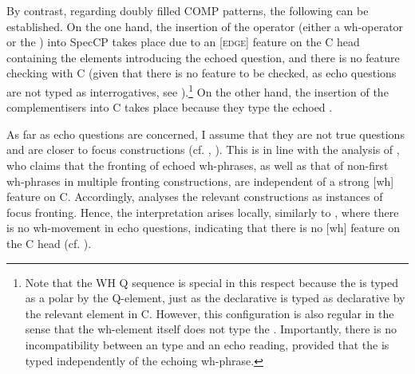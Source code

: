 \documentclass[output=paper,modfonts, hidelinks, newtxmath]{langscibook}
\begin{document}
\largerpage[-2]
By contrast, regarding  doubly filled COMP patterns, the following can be established. On the one hand, the insertion of the operator (either a wh-op\-er\-a\-tor or the ) into SpecCP takes place due to an [\textsc{edge}] feature on the C head containing the elements introducing the echoed question, and there is no feature checking with C (given that there is no  feature to be checked, as echo questions are not typed as interrogatives, see \citealt[363]{boskovic2002}).\footnote{Note that the WH Q sequence is special in this respect because the  is typed as a polar  by the Q-element, just as the declarative  is typed as declarative by the relevant element in C. However, this configuration is also regular in the sense that the wh-element itself does not type the . Importantly, there is no incompatibility between an   type and an echo reading, provided that the  is typed independently of the echoing wh-phrase.} On the other hand, the insertion of the complementisers into C takes place because they type the echoed .

As far as echo questions are concerned, I assume that they are not true questions and are closer to focus constructions (cf. \citealt{boskovic2002}, \citealt{artsein2002}). This is in line with the analysis of \citet{boskovic2002}, who claims that the fronting of echoed wh-phrases, as well as that of non-first wh-phrases in multiple fronting constructions, are independent of a strong [wh] feature on C. Accordingly, \citet[359--364]{boskovic2002} analyses the relevant constructions as instances of focus fronting. Hence, the  interpretation arises locally, similarly to , where there is no wh-movement in echo questions, indicating that there is no [wh] feature on the C head (cf. \citealt[363]{boskovic2002}).
\end{document}
